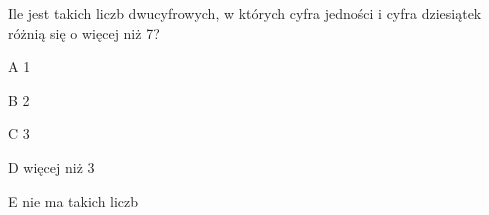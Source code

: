 \begin{tresc}
Ile jest takich liczb dwucyfrowych, w których cyfra jedności i cyfra dziesiątek różnią się o więcej niż 7?
\end{tresc}
\begin{wariant}{A} 1 \end{wariant}
\begin{wariant}{B} 2 \end{wariant}
\begin{wariant}{C} 3 \end{wariant}
\begin{wariant}{D} więcej niż 3 \end{wariant}
\begin{wariant}{E} nie ma takich liczb \end{wariant}
